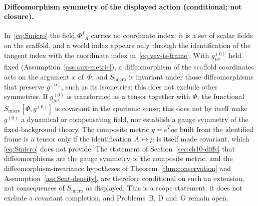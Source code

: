 \paragraph{Diffeomorphism symmetry of the displayed action (conditional; not closure).}
In~\eqref{eq:Smicro} the field \(\Phi^I{}_A\) carries no coordinate index: it
is a set of scalar fields on the scaffold, and a world index appears only
through the identification of the tangent index with the coordinate index
in~\eqref{eq:vev-is-frame}. With \(g^{(0)}_{\mu\nu}\) held fixed
(Assumption~\ref{ass:aux-metric}), a diffeomorphism of the scaffold coordinates
acts on the argument \(x\) of~\(\Phi\), and \(S_{\mathrm{micro}}\) is
invariant under those diffeomorphisms that preserve \(g^{(0)}\), such as its
isometries; this does not exclude other symmetries. If \(g^{(0)}_{\mu\nu}\) is
transformed as a tensor together with \(\Phi\), the functional
\(S_{\mathrm{micro}}[\Phi,g^{(0)}]\) is covariant in the spurionic sense; this
does not by itself make \(g^{(0)}\) a dynamical or compensating field, nor
establish a gauge symmetry of the fixed-background theory. The composite
metric \(g=e^{T}\eta e\) built from the identified frame is a tensor only if
the identification \(A\leftrightarrow\mu\) is itself made covariant, which
\eqref{eq:Smicro} does not provide. The statement of
Section~\ref{sec:ch10-diffs} that diffeomorphisms are the gauge symmetry of
the composite metric, and the diffeomorphism-invariance hypotheses of
Theorem~\ref{thm:conservation} and Assumption~\ref{ass:Sent-density}, are
therefore conditional on such an extension, not consequences of
\(S_{\mathrm{micro}}\) as displayed. This is a scope statement; it does not
exclude a covariant completion, and Problems~B, D and~G remain open.

